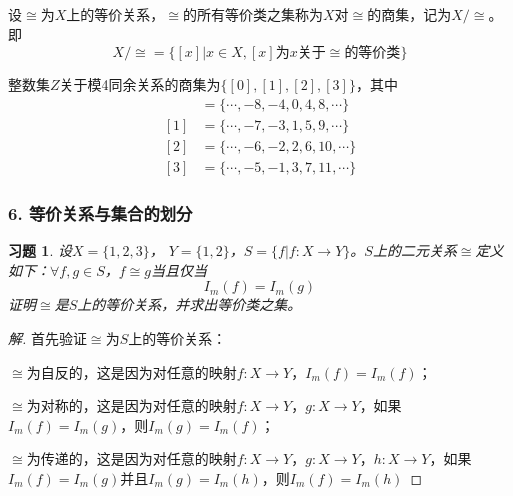 \documentclass{beamer}
\newtheorem*{Exercise}{习题}
\begin{document}
\begin{CJK*}{UTF8}{gbsn}
\begin{frame}
\end{frame}

\begin{frame}
  \begin{Def}
    设$\cong$为$X$上的等价关系，$\cong$的所有等价类之集称为$X$对$\cong$的商集，记为$X/\cong$。即
    \[X/\cong = \{[x]|x\in X,[x]\text{为}x\text{关于}\cong \text{的等价类}\}\]
  \end{Def}
\pause
  整数集$Z$关于模4同余关系的商集为$\{[0],[1],[2],[3]\}$，其中
  \begin{align*}
    [0]&=\{\cdots,-8,-4,0,4,8,\cdots\}\\
    [1]&=\{\cdots,-7,-3,1,5,9,\cdots\}\\
    [2]&=\{\cdots,-6,-2,2,6,10,\cdots\}\\
    [3]&=\{\cdots,-5,-1,3,7,11,\cdots\}
  \end{align*}
\end{frame}
\begin{frame}
  \frametitle{6. 等价关系与集合的划分}
  \begin{Exercise}
  设$X = \{1,2,3\}$， $Y = \{1,2\}$，$S = \{f|f:X \to Y\}$。$S$上的二元关系$\cong$定义如下：$\forall f,g\in S$，$f \cong g$当且仅当\[I_m(f) = I_m(g)\]证明$\cong$是$S$上的等价关系，并求出等价类之集。    
\end{Exercise}
\pause
\begin{proof}[解]\justifying\let\raggedright\justifying
  首先验证$\cong$为$S$上的等价关系：
  
\pause
    $\cong$为自反的，这是因为对任意的映射$f:X\to Y$，$I_m(f)=I_m(f)$；

    \pause
    $\cong$为对称的，这是因为对任意的映射$f:X\to Y$，$g:X\to Y$，如果$I_m(f)=I_m(g)$，则$I_m(g)=I_m(f)$；

    \pause
    $\cong$为传递的，这是因为对任意的映射$f:X\to Y$，$g:X\to Y$，$h:X\to Y$，如果$I_m(f)=I_m(g)$并且$I_m(g)=I_m(h)$，则$I_m(f)=I_m(h)$
  \end{proof}
  

\end{frame}
\end{CJK*}
\end{document}
